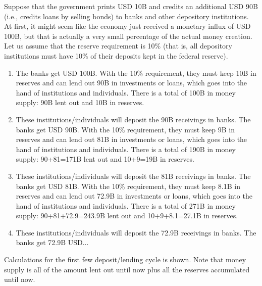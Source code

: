 \documentclass{article}
\begin{document}
    \begin{example}
      \label{ex:the-credit-market-funnel}
      Suppose that the government prints USD 10B and credits an additional USD 90B (i.e., credits loans by selling bonds) to banks and other depository institutions. At first, it might seem like the economy just received a monetary influx of USD 100B, but that is actually a very small percentage of the actual money creation. Let us assume that the reserve requirement is 10\% (that is, all depository institutions must have 10\% of their deposits kept in the federal reserve).

      \begin{enumerate}
        \item The banks get USD 100B. With the 10\% requirement, they must keep 10B in reserves and can lend out 90B in investments or loans, which goes into the hand of institutions and individuals. There is a total of 100B in money supply: 90B lent out and 10B in reserves.
        \item These institutions/individuals will deposit the 90B receivings in banks. The banks get USD 90B. With the 10\% requirement, they must keep 9B in reserves and can lend out 81B in investments or loans, which goes into the hand of institutions and individuals. There is a total of 190B in money supply: 90+81=171B lent out and 10+9=19B in reserves.
        \item These institutions/individuals will deposit the 81B receivings in banks. The banks get USD 81B. With the 10\% requirement, they must keep 8.1B in reserves and can lend out 72.9B in investments or loans, which goes into the hand of institutions and individuals. There is a total of 271B in money supply: 90+81+72.9=243.9B lent out and 10+9+8.1=27.1B in reserves.
        \item These institutions/individuals will deposit the 72.9B receivings in banks. The banks get 72.9B USD...
      \end{enumerate}

      Calculations for the first few deposit/lending cycle is shown. Note that money supply is all of the amount lent out until now plus all the reserves accumulated until now.


\end{example}
\end{document}
